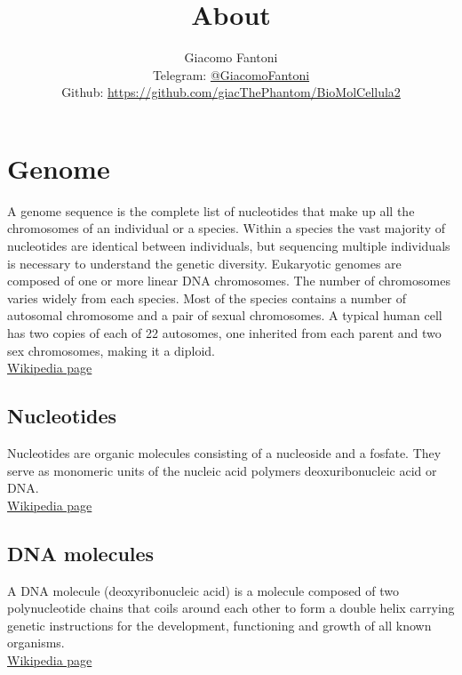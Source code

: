 

\title{\Huge \textbf{About}}

\author{
  Giacomo Fantoni \\
  \small Telegram: \href{https://t.me/GiacomoFantoni}{@GiacomoFantoni} \\[3pt]
  \small Github: \href{https://github.com/giacThePhantom/BioMolCellula2}{https://github.com/giacThePhantom/BioMolCellula2}}

\maketitle
\tableofcontents

\chapter{Genome}
A genome sequence is the complete list of nucleotides that make up all the chromosomes of an individual or a species.
Within a species the vast majority of nucleotides are identical between individuals, but sequencing multiple individuals is necessary to understand the genetic diversity.
Eukaryotic genomes are composed of one or more linear DNA chromosomes.
The number of chromosomes varies widely from each species.
Most of the species contains a number of autosomal chromosome and a pair of sexual chromosomes.
A typical human cell has two copies of each of 22 autosomes, one inherited from each parent and two
sex chromosomes, making it a diploid.\\
\href{https://en.wikipedia.org/wiki/Genome}{Wikipedia page}
\section{Nucleotides}
Nucleotides are organic molecules consisting of a nucleoside and a fosfate.
They serve as monomeric units of the nucleic acid polymers deoxuribonucleic acid or DNA.\\
\href{https://en.wikipedia.org/wiki/Nucleotide}{Wikipedia page}
\section{DNA molecules}
A DNA molecule (deoxyribonucleic acid) is a molecule composed of two polynucleotide chains that coils around each other to form a double helix carrying genetic instructions for the development, functioning and growth of all known organisms.\\
\href{https://en.wikipedia.org/wiki/DNA}{Wikipedia page}
